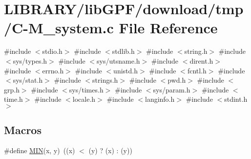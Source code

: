 \hypertarget{C-M__system_8c}{}\section{L\+I\+B\+R\+A\+R\+Y/lib\+G\+P\+F/download/tmp/\+C-\/\+M\+\_\+system.c File Reference}
\label{C-M__system_8c}
{\ttfamily \#include $<$stdio.\+h$>$}\newline
{\ttfamily \#include $<$stdlib.\+h$>$}\newline
{\ttfamily \#include $<$string.\+h$>$}\newline
{\ttfamily \#include $<$sys/types.\+h$>$}\newline
{\ttfamily \#include $<$sys/utsname.\+h$>$}\newline
{\ttfamily \#include $<$dirent.\+h$>$}\newline
{\ttfamily \#include $<$errno.\+h$>$}\newline
{\ttfamily \#include $<$unistd.\+h$>$}\newline
{\ttfamily \#include $<$fcntl.\+h$>$}\newline
{\ttfamily \#include $<$sys/stat.\+h$>$}\newline
{\ttfamily \#include $<$strings.\+h$>$}\newline
{\ttfamily \#include $<$pwd.\+h$>$}\newline
{\ttfamily \#include $<$grp.\+h$>$}\newline
{\ttfamily \#include $<$sys/times.\+h$>$}\newline
{\ttfamily \#include $<$sys/param.\+h$>$}\newline
{\ttfamily \#include $<$time.\+h$>$}\newline
{\ttfamily \#include $<$locale.\+h$>$}\newline
{\ttfamily \#include $<$langinfo.\+h$>$}\newline
{\ttfamily \#include $<$stdint.\+h$>$}\newline
\subsection*{Macros}
\begin{DoxyCompactItemize}
\item 
\#define \hyperlink{C-M__system_8c_a74e75242132eaabbc1c512488a135926}{M\+IN}(x,  y)~((x) $<$ (y) ? (x) \+: (y))
\end{DoxyCompactItemize}
